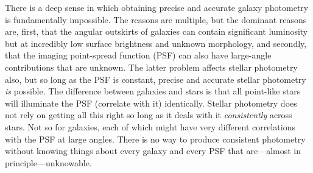 \documentclass[12pt,preprint,pdftex]{aastex}
\begin{document}
There is a deep sense in which obtaining precise and accurate galaxy
photometry is fundamentally impossible.  The reasons are multiple, but
the dominant reasons are, first, that the angular outskirts of
galaxies can contain significant luminosity but at incredibly low
surface brightness and unknown morphology, and secondly, that the
imaging point-spread function (PSF) can also have large-angle
contributions that are unknown.  The latter problem affects stellar
photometry also, but so long as the PSF is constant, precise and
accurate stellar photometry \emph{is} possible.  The difference
between galaxies and stars is that all point-like stars will
illuminate the PSF (correlate with it) identically.  Stellar
photometry does not rely on getting all this right so long as it deals
with it \emph{consistently} across stars.  Not so for galaxies, each
of which might have very different correlations with the PSF at large
angles.  There is no way to produce consistent photometry without
knowing things about every galaxy and every PSF that are---almost in
principle---unknowable.
\end{document}

